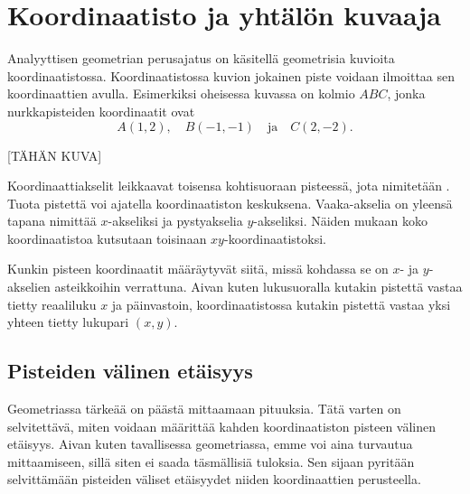 \section{Koordinaatisto ja yhtälön kuvaaja}


Analyyttisen geometrian perusajatus on käsitellä geometrisia kuvioita koordinaatistossa.
Koordinaatistossa kuvion jokainen piste voidaan ilmoittaa sen koordinaattien avulla.
Esimerkiksi oheisessa kuvassa on kolmio $ABC$, jonka nurkkapisteiden koordinaatit ovat
\[
A(1, 2), \quad B(-1, -1) \quad \text{ja} \quad C(2, -2).
\]

[TÄHÄN KUVA]

Koordinaattiakselit leikkaavat toisensa kohtisuoraan pisteessä, jota nimitetään .
Tuota pistettä voi ajatella koordinaatiston keskuksena.
Vaaka-akselia on yleensä tapana nimittää $x$-akseliksi ja pystyakselia $y$-akseliksi.
Näiden mukaan koko koordinaatistoa kutsutaan toisinaan $xy$-koordinaatistoksi.

Kunkin pisteen koordinaatit määräytyvät siitä, missä kohdassa se on $x$- ja $y$-akselien asteikkoihin verrattuna.
Aivan kuten lukusuoralla kutakin pistettä vastaa tietty reaaliluku $x$ ja päinvastoin, koordinaatistossa kutakin pistettä vastaa yksi yhteen tietty lukupari $(x, y)$.

\subsection{Pisteiden välinen etäisyys}

Geometriassa tärkeää on päästä mittaamaan pituuksia.
Tätä varten on selvitettävä, miten voidaan määrittää kahden koordinaatiston pisteen välinen etäisyys.
Aivan kuten tavallisessa geometriassa, emme voi aina turvautua mittaamiseen, sillä siten ei saada täsmällisiä tuloksia.
Sen sijaan pyritään selvittämään pisteiden väliset etäisyydet niiden koordinaattien perusteella.

